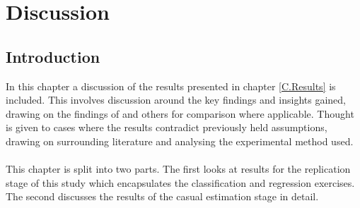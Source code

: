 %
%
%
%

\chapter{Discussion}\label{C.Discussion}
\section{Introduction}\label{S.Discussion.intro}
In this chapter a discussion of the results presented in chapter \ref{C.Results} is included. This involves discussion around the key findings and insights gained, drawing on the findings of \cite{moldovan2015learning} and others for comparison where applicable. Thought is given to cases where the results contradict previously held assumptions, drawing on surrounding literature and analysing the experimental method used. \\\\This chapter is split into two parts. The first looks at results for the replication stage of this study which encapsulates the classification and regression exercises. The second discusses the results of the casual estimation stage in detail. 
